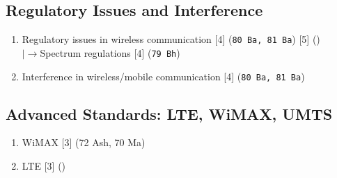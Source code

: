 \documentclass[12pt]{article}
\newcommand{\lb}{\\$\left|\rightarrow\right.$}
\begin{document}
  \subsection{Regulatory Issues and Interference}
    \begin{enumerate}[topsep=0pt, noitemsep]
      \item Regulatory issues in wireless communication \hfill [4] (\texttt{80 Ba, 81 Ba}) [5] ()
        \lb Spectrum regulations \hfill [4] (\texttt{79 Bh})
      \item Interference in wireless/mobile communication \hfill [4] (\texttt{80 Ba, 81 Ba})
    \end{enumerate}

  \subsection{Advanced Standards: LTE, WiMAX, UMTS}
    \begin{enumerate}[topsep=0pt, noitemsep]
      \item WiMAX \hfill [3] (72 Ash, 70 Ma)
      \item LTE \hfill [3] ()
    \end{enumerate}
\end{document}
